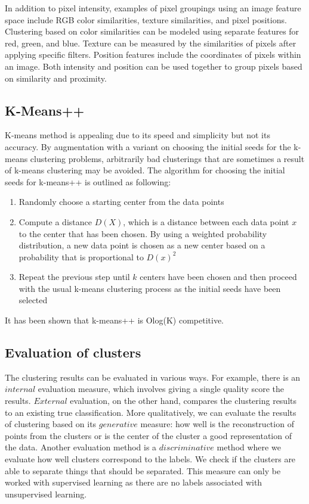 \documentclass{article}
\begin{document}
In addition to pixel intensity, examples of pixel groupings using an image feature space include RGB color similarities, texture similarities, and pixel positions. Clustering based on color similarities can be modeled using separate features for red, green, and blue. Texture can be measured by the similarities of pixels after applying specific filters. Position features include the coordinates of pixels within an image. Both intensity and position can be used together to group pixels based on similarity and proximity.

\subsection{K-Means++}
K-means method is appealing due to its speed and simplicity but not its accuracy. By augmentation with a variant on choosing the initial seeds for the k-means clustering problems, arbitrarily bad clusterings that are sometimes a result of k-means clustering may be avoided. The algorithm for choosing the initial seeds for k-means++ is outlined as following:
\begin{enumerate}
    \item Randomly choose a starting center from the data points
    \item Compute a distance $D(X)$, which is a distance between each data point $x$ to the center that has been chosen. By using a weighted probability distribution, a new data point is chosen as a new center based on a probability that is proportional to $D(x)^2$
    \item Repeat the previous step until $k$ centers have been chosen and then proceed with the usual k-means clustering process as the initial seeds have been selected
\end{enumerate}
It has been shown that k-means++ is Olog(K) competitive.

\subsection{Evaluation of clusters}
The clustering results can be evaluated in various ways. For example, there is an $internal$ evaluation measure, which involves giving a single quality score the results. $External$ evaluation, on the other hand, compares the clustering results to an existing true classification. More qualitatively, we can evaluate the results of clustering based on its $generative$ measure: how well is the reconstruction of points from the clusters or is the center of the cluster a good representation of the data. Another evaluation method is a $discriminative$ method where we evaluate how well clusters correspond to the labels. We check if the clusters are able to separate things that should be separated. This measure can only be worked with supervised learning as there are no labels associated with unsupervised learning. 
\end{document}
